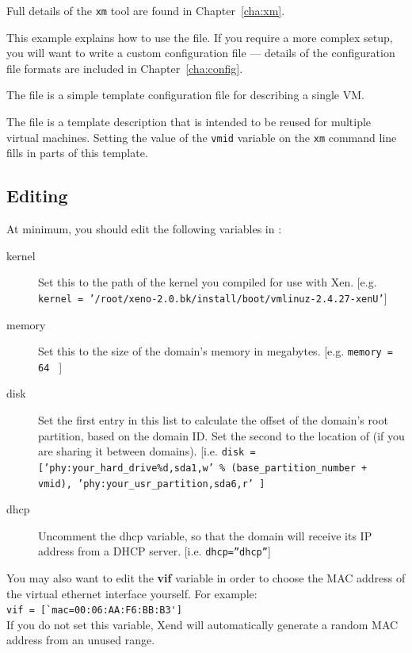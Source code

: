 \documentclass[11pt,twoside,final,openright]{xenstyle}
\begin{document}
Full details of the {\tt xm} tool are found in Chapter~\ref{cha:xm}.

This example explains how to use the  file.  If you
require a more complex setup, you will want to write a custom
configuration file --- details of the configuration file formats are
included in Chapter~\ref{cha:config}.

The  file is a simple template configuration file
for describing a single VM.

The  file is a template description that is intended
to be reused for multiple virtual machines.  Setting the value of the
{\tt vmid} variable on the {\tt xm} command line
fills in parts of this template.

\subsection{Editing }

At minimum, you should edit the following variables in :

\begin{description}
\item[kernel] Set this to the path of the kernel you compiled for use
              with Xen. [e.g. {\tt kernel =
              '/root/xeno-2.0.bk/install/boot/vmlinuz-2.4.27-xenU'}]
\item[memory] Set this to the size of the domain's memory in
megabytes. [e.g. {\tt memory = 64 } ]
\item[disk] Set the first entry in this list to calculate the offset
of the domain's root partition, based on the domain ID.  Set the
second to the location of  (if you are sharing it between
domains). [i.e. {\tt disk = ['phy:your\_hard\_drive\%d,sda1,w' \%
(base\_partition\_number + vmid), 'phy:your\_usr\_partition,sda6,r' ]}
\item[dhcp] Uncomment the dhcp variable, so that the domain will
receive its IP address from a DHCP server. [i.e. {\tt dhcp=''dhcp''}]
\end{description}

You may also want to edit the {\bf vif} variable in order to choose
the MAC address of the virtual ethernet interface yourself.  For
example: \\ \verb_vif = [`mac=00:06:AA:F6:BB:B3']_\\ If you do not set
this variable, Xend will automatically generate a random MAC address
from an unused range.
\end{document}
